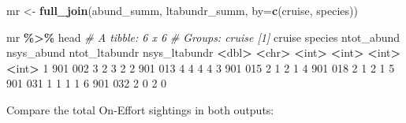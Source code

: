 \documentclass[
]{book}
\newenvironment{Shaded}{\begin{snugshade}}{\end{snugshade}}
\newcommand{\AttributeTok}[1]{\textcolor[rgb]{0.13,0.29,0.53}{#1}}
\newcommand{\CommentTok}[1]{\textcolor[rgb]{0.56,0.35,0.01}{\textit{#1}}}
\newcommand{\ConstantTok}[1]{\textcolor[rgb]{0.56,0.35,0.01}{#1}}
\newcommand{\DecValTok}[1]{\textcolor[rgb]{0.00,0.00,0.81}{#1}}
\newcommand{\ErrorTok}[1]{\textcolor[rgb]{0.64,0.00,0.00}{\textbf{#1}}}
\newcommand{\FunctionTok}[1]{\textcolor[rgb]{0.13,0.29,0.53}{\textbf{#1}}}
\newcommand{\NormalTok}[1]{#1}
\newcommand{\OtherTok}[1]{\textcolor[rgb]{0.56,0.35,0.01}{#1}}
\newcommand{\SpecialCharTok}[1]{\textcolor[rgb]{0.81,0.36,0.00}{\textbf{#1}}}
\newcommand{\StringTok}[1]{\textcolor[rgb]{0.31,0.60,0.02}{#1}}
\begin{document}
\begin{Shaded}
\begin{Highlighting}[]
\NormalTok{mr }\OtherTok{\textless{}{-}} \FunctionTok{full\_join}\NormalTok{(abund\_summ, ltabundr\_summ, }\AttributeTok{by=}\FunctionTok{c}\NormalTok{(}\StringTok{\textquotesingle{}cruise\textquotesingle{}}\NormalTok{, }\StringTok{\textquotesingle{}species\textquotesingle{}}\NormalTok{))}

\NormalTok{mr }\SpecialCharTok{\%\textgreater{}\%}\NormalTok{ head}
\CommentTok{\# A tibble: 6 x 6}
\CommentTok{\# Groups:   cruise [1]}
\NormalTok{  cruise species ntot\_abund nsys\_abund ntot\_ltabundr nsys\_ltabundr}
   \SpecialCharTok{\textless{}}\NormalTok{dbl}\SpecialCharTok{\textgreater{}} \ErrorTok{\textless{}}\NormalTok{chr}\SpecialCharTok{\textgreater{}}        \ErrorTok{\textless{}}\NormalTok{int}\SpecialCharTok{\textgreater{}}      \ErrorTok{\textless{}}\NormalTok{int}\SpecialCharTok{\textgreater{}}         \ErrorTok{\textless{}}\NormalTok{int}\SpecialCharTok{\textgreater{}}         \ErrorTok{\textless{}}\NormalTok{int}\SpecialCharTok{\textgreater{}}
\DecValTok{1}    \DecValTok{901} \DecValTok{002}              \DecValTok{3}          \DecValTok{2}             \DecValTok{3}             \DecValTok{2}
\DecValTok{2}    \DecValTok{901} \DecValTok{013}              \DecValTok{4}          \DecValTok{4}             \DecValTok{4}             \DecValTok{4}
\DecValTok{3}    \DecValTok{901} \DecValTok{015}              \DecValTok{2}          \DecValTok{1}             \DecValTok{2}             \DecValTok{1}
\DecValTok{4}    \DecValTok{901} \DecValTok{018}              \DecValTok{2}          \DecValTok{1}             \DecValTok{2}             \DecValTok{1}
\DecValTok{5}    \DecValTok{901} \DecValTok{031}              \DecValTok{1}          \DecValTok{1}             \DecValTok{1}             \DecValTok{1}
\DecValTok{6}    \DecValTok{901} \DecValTok{032}              \DecValTok{2}          \DecValTok{0}             \DecValTok{2}             \DecValTok{0}
\end{Highlighting}
\end{Shaded}

Compare the total On-Effort sightings in both outputs:

\begin{Shaded}
\end{Shaded}
\end{document}

